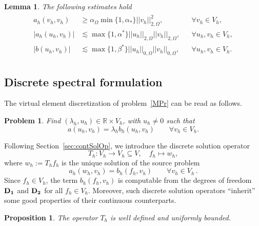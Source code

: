 \documentclass[final,reqno]{elsarticle}
\newtheorem{lemma}{Lemma}[section]
\newtheorem{proposition}{Proposition}[section]
\newtheorem{problem}{Problem}
\begin{document}
\begin{lemma}\label{Disc_BoundAndEllip}
The following estimates hold
\begin{align*}
\begin{aligned}
a_{h}(v_{h},v_{h})& \geq  \alpha_{\Omega}\min\{1,\alpha_{*} \}  ||v_{h}||_{2,\Omega}^2,
&&\forall v_{h}\in  V_{h},\\	
|a_{h}(u_{h},v_{h})|& \lesssim \max\{1,\alpha^{*}\} ||u_{h}||_{2,\Omega}||v_{h}||_{2,\Omega},
&&\forall u_{h},v_{h}\in V_{h},\\
|b(u_{h},v_{h})|& \lesssim \max\{1,\beta^{*}\}||u_{h}||_{0,\Omega}||v_{h}||_{0,\Omega},
&&\forall u_{h},v_{h}\in V_{h}.
\end{aligned}
\end{align*}
\label{Bound_Elli_h}
\end{lemma} 
\subsection{Discrete spectral formulation}

The virtual element discretization of problem~\eqref{MPr} can be read as follows.
\begin{problem}\label{DiscVP}
Find $(\lambda_h,u_h)\in \mathbb{R}\times V_h$, with $u_h\neq 0$ such that
\begin{equation*}
    a(u_h,v_h)=\lambda_h b_h(u_h,v_h)\qquad \forall v_h\in V_h.
\end{equation*}
\end{problem} 
\noindent Following Section~\ref{sec:contSolOp}, we introduce the discrete solution operator
\begin{equation*}
T_h:V_h \rightarrow  V_h\subseteq  V, \quad
 f_h \longmapsto w_h,
\end{equation*}
where $w_h:=T_hf_h$ is the unique solution of the  source problem
\begin{equation}\label{DiscreteSourceProblem}
a_{h} (w_{h},v_{h})=b_{h}(f_h,v_{h}) \qquad\forall v_{h}\in V_h\,.
\end{equation}
Since $f_h\in V_h$, 
the term $b_{h}( f_h,v_{h})$ is  computable from the degrees of freedom ${\bf D_1}$ and ${\bf D_2}$ for all $f_h\in V_h$.
Moreover, such discrete solution operators ``inherit'' some good properties of their continuous counterparts.

\begin{proposition}
The operator $T_h$ is well defined and uniformly bounded.
\end{proposition}
\end{document}
